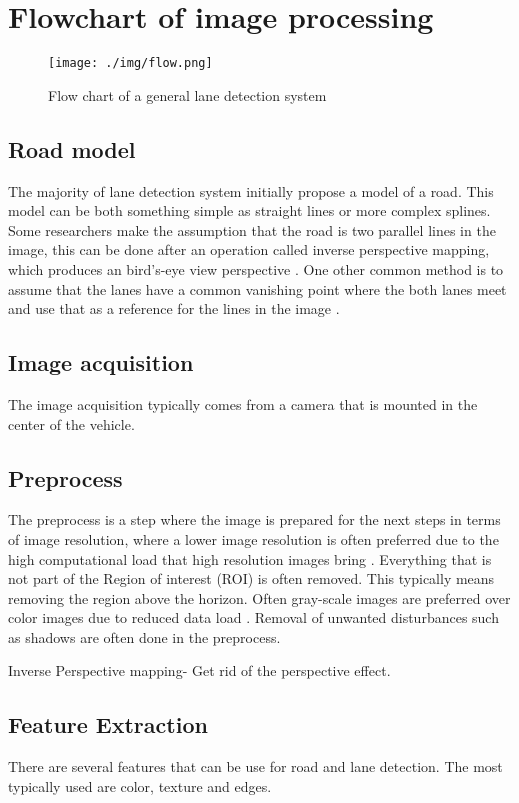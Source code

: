\section{Flowchart of image processing}

\begin{figure}[H]
  \texttt{[image: ./img/flow.png]}
  \centering
  \caption{Flow chart of a general lane detection system}
  \label{fig:Software architecture of the EMC2 platform}
\end{figure}


\subsection{Road model}
The majority of lane detection system initially propose a model of a road. This model can be both something simple as straight lines or more complex splines. Some researchers make the assumption that the road is two parallel lines in the image, this can be done after an operation called inverse perspective mapping, which produces an bird's-eye view  perspective \cite{bertozzi1998gold}. One other common method is to assume that the lanes have a common vanishing point where the both lanes meet and use that as a reference for the lines in the image \cite{Yenikaya:2013:KVR:2522968.2522970}\cite{jingyu2013lane}.
\subsection{Image acquisition}
The image acquisition typically comes from a camera that is mounted in the center of the vehicle.
\subsection{Preprocess}
The preprocess is a step where the image is prepared for the next steps in terms of image resolution, where a lower image resolution is often preferred due to the high computational load that high resolution images bring \cite{Yenikaya:2013:KVR:2522968.2522970}. Everything that is not part of the Region of interest (ROI) is often removed. This typically means removing the region above the horizon. Often gray-scale images are preferred over color images due to reduced data load \cite{Yenikaya:2013:KVR:2522968.2522970}. Removal of unwanted disturbances such as shadows are often done in the preprocess. 


Inverse Perspective mapping- Get rid of the perspective effect. 

\subsection{Feature Extraction}
There are several features that can be use for road and lane detection. The most typically used are color, texture and edges.

